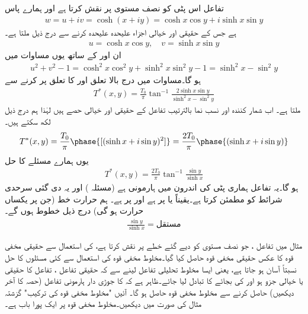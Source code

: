 تفاعل  اس پٹی کو نصف مستوی  پر نقش کرتا ہے اور  ہمارے پاس
\begin{align*}
w=u+iv=\cosh (x+iy)=\cosh x\cos y+i\sinh x\sin y
\end{align*}
ہے جس کے حقیقی اور خیالی اجزاء علیحدہ علیحدہ کرنے سے درج ذیل ملتا ہے۔
\begin{align*}
u=\cosh x\cos y,\quad v=\sinh x\sin y
\end{align*}
ان  اور  کے ساتھ یوں مساوات  میں
\begin{align*}
u^2+v^2-1=\cosh^2 x\cos^2 y+\sinh^2 x\sin^2 y-1=\sinh^2x-\sin^2y
\end{align*}
ہو گا۔مساوات  میں درج بالا تعلق اور  کا تعلق پر کرنے سے
\begin{align*}
T^*(x,y)=\frac{T_0}{\pi}\tan^{-1} \frac{2\sinh x\sin y}{\sinh^2 x-\sin^2 y}
\end{align*}
ملتا ہے۔ اب شمار کنندہ اور نسب نما بالترتیب تفاعل  کے  حقیقی اور خیالی حصے ہیں لہٰذا ہم درج ذیل لکھ سکتے ہیں۔
\begin{align*}
T^*(x,y)=\frac{T_0}{\pi} \phase{[(\sinh x+i\sin y)^2]}=\frac{2T_0}{\pi} \phase{(\sinh x+i\sin y)}
\end{align*}
یوں ہمارے مسئلے کا حل 
\begin{align}
T^*(x,y)=\frac{2T_0}{\pi} \tan^{-1} \frac{\sin y}{\sinh x}
\end{align}
ہو گا۔یہ تفاعل ہماری پٹی کی اندرون میں ہارمونی ہے (مسئلہ ) اور یہ دی گئی سرحدی شرائط کو مطمئن کرتا ہے۔یقیناً  یا  پر  ہے اور  پر  ہے۔ ہم حرارت خط (جن پر یکساں حرارت ہو گی) درج ذیل خطوط ہوں گے۔
\begin{align*}
\frac{\sin y}{\sinh x}=\text{مستقل}
\end{align*}

مثال  میں تفاعل ، جو نصف مستوی کو دیے گئے خطے پر نقش کرتا ہے، کی استعمال سے حقیقی مخفی قوہ   کا عکس حقیقی مخفی قوہ  حاصل کیا گیا۔مخلوط مخفی قوہ کی استعمال سے کئی مسئلوں کا حل نسبتاً آسان ہو جاتا ہے، یعنی ایسا مخلوط تحلیلی تفاعل  لینے سے  کہ حقیقی تفاعل ، تفاعل  کا حقیقی یا خیالی جزو ہو اور  کی بجائے  کا تبادل لیا جائے۔ظاہر ہے کہ  کا جوڑی دار ہارمونی تفاعل (حصہ  کا آخر دیکھیں) حاصل کرنے سے  مخلوط مخفی قوہ   حاصل ہو گا۔  آئیں  "مخلوط مخفی قوہ کی ترکیب"  گزشتہ مثال کی صورت میں دیکھیں۔مخلوط مخفی قوہ پر ایک پورا باب ہے۔


